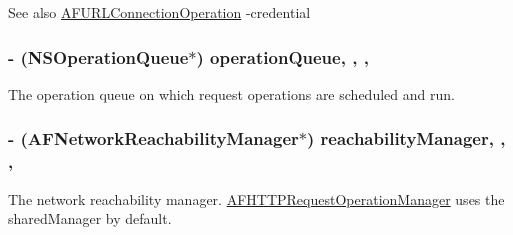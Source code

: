 \begin{DoxySeeAlso}{See also}
\hyperlink{interface_a_f_u_r_l_connection_operation}{A\+F\+U\+R\+L\+Connection\+Operation} -\/credential 
\end{DoxySeeAlso}
\hypertarget{interface_a_f_h_t_t_p_request_operation_manager_a6e21f749221364a42aa042c16c583017}{}
\subsubsection[{operation\+Queue}]{\setlength{\rightskip}{0pt plus 5cm}-\/ (N\+S\+Operation\+Queue$\ast$) operation\+Queue\hspace{0.3cm}{\ttfamily [read]}, {\ttfamily [write]}, {\ttfamily [nonatomic]}, {\ttfamily [strong]}}\label{interface_a_f_h_t_t_p_request_operation_manager_a6e21f749221364a42aa042c16c583017}
The operation queue on which request operations are scheduled and run. \hypertarget{interface_a_f_h_t_t_p_request_operation_manager_ac77a1fb46d90d7e7b8b9c25bc80feb8a}{}
\subsubsection[{reachability\+Manager}]{\setlength{\rightskip}{0pt plus 5cm}-\/ ({\bf A\+F\+Network\+Reachability\+Manager}$\ast$) reachability\+Manager\hspace{0.3cm}{\ttfamily [read]}, {\ttfamily [write]}, {\ttfamily [nonatomic]}, {\ttfamily [strong]}}\label{interface_a_f_h_t_t_p_request_operation_manager_ac77a1fb46d90d7e7b8b9c25bc80feb8a}
The network reachability manager. {\ttfamily \hyperlink{interface_a_f_h_t_t_p_request_operation_manager}{A\+F\+H\+T\+T\+P\+Request\+Operation\+Manager}} uses the {\ttfamily shared\+Manager} by default. \hypertarget{interface_a_f_h_t_t_p_request_operation_manager_ad5b4501e37b6b27dd94b17cd16d87287}{}
